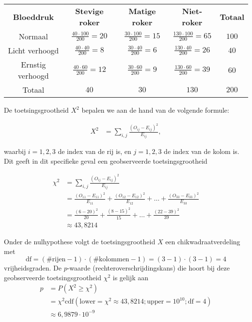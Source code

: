 {    \begin{center}
        \renewcommand{\arraystretch}{1.5}
        \begin{tabular}{ccccc}
            \toprule
                {\bfseries Bloeddruk} & {\bfseries Stevige roker} & {\bfseries Matige roker} & {\bfseries Niet-roker} & {\bfseries Totaal} \\
            \cmidrule{1-1} \cmidrule{2-2} \cmidrule{3-3} \cmidrule{4-4} \cmidrule{5-5}
                Normaal & $\frac{40\cdot 100}{200} = 20$ & $\frac{30\cdot 100}{200} = 15$ & $\frac{130\cdot 100}{200} = 65$ & $100$ \\
                Licht verhoogd & $\frac{40\cdot 40}{200} = 8$ & $\frac{30\cdot 40}{200} = 6$ & $\frac{130\cdot 40}{200} = 26$ & $40$ \\
                Ernstig verhoogd & $\frac{40\cdot 60}{200} = 12$ & $\frac{30\cdot 60}{200} = 9$ & $\frac{130\cdot 60}{200} = 39$ & $60$ \\
            \cmidrule{1-1} \cmidrule{2-2} \cmidrule{3-3} \cmidrule{4-4} \cmidrule{5-5}
                Totaal & $40$ & $30$ & $130$ & $200$ \\
            \bottomrule
        \end{tabular}
    \end{center}

    De toetsingsgrootheid $X^2$ bepalen we aan de hand van de volgende formule:

    \begin{align*}
        X^2  &= \sum_{i,j} \frac{(O_{ij} - E_{ij})^2}{E_{ij}},
    \end{align*}

    waarbij $i = 1,2,3$ de index van de rij is, en $j = 1,2,3$ de index van de kolom is.
    Dit geeft in dit specifieke geval een geobserveerde toetsingsgrootheid 
    
    \begin{align*}
        \chi^2  &= \sum_{i,j} \frac{(O_{ij} - E_{ij})^2}{E_{ij}} \\
                &=\frac{(O_{11} - E_{11})^2}{E_{11}} + \frac{(O_{12} - E_{12})^2}{E_{12}} + \ldots + \frac{(O_{33} - E_{33})^2}{E_{33}} \\
                &= \frac{(6 - 20)^2}{20} + \frac{(8 - 15)^2}{15} + \ldots + \frac{(22-39)^2}{39}\\
                &\approx 43,8214
    \end{align*}

    Onder de nulhypothese volgt de toetsingsgrootheid $X$ een chikwadraatverdeling met
    \[
        \text{df} = (\#\text{rijen}-1) \cdot (\#\text{kolommen}-1) = (3-1)\cdot(3-1) = 4
    \]
    vrijheidsgraden.
    De $p$-waarde (rechteroverschrijdingskans) die hoort bij deze geobserveerde toetsingsgrootheid $\chi^2$ is gelijk aan
    \begin{align*}
        p   &= P(X^2 \ge \chi^2) \\
            &= \chi^2\text{cdf}(\text{lower}=\chi^2\approx43,8214; \text{upper}=10^{10}; \text{df}=4) \\
            &\approx 6,9879 \cdot 10^{-9}
    \end{align*}

}
